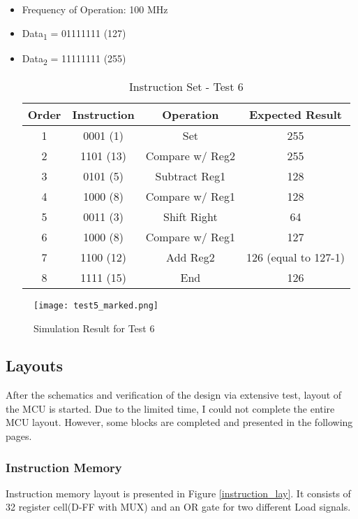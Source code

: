 \documentclass[12pt]{article}
\begin{document}
\begin{itemize}
\item Frequency of Operation: 100 MHz
\item Data\textsubscript{1} = 01111111 (127) 
\item Data\textsubscript{2} = 11111111 (255) 
\begin{table}[h]
\centering
\begin{tabular}{|c|c|c|c|}
\hline 
Order & Instruction & Operation & Expected Result \\ 
\hline 
1 & 0001 (1) & Set & 255 \\ 
\hline 
2 & 1101 (13) & Compare w/ Reg2 & 255 \\ 
\hline 
3 & 0101 (5) & Subtract Reg1 & 128 \\ 
\hline 
4 & 1000 (8) & Compare w/ Reg1 & 128 \\ 
\hline 
5 & 0011 (3) & Shift Right & 64 \\ 
\hline 
6 & 1000 (8) & Compare w/ Reg1 & 127 \\ 
\hline 
7 & 1100 (12) & Add Reg2 & 126 (equal to 127-1) \\ 
\hline 
8 & 1111 (15) & End & 126 \\ 
\hline 
\end{tabular} 
\caption{Instruction Set - Test 6}
\end{table}
\end{itemize}


\begin{figure}[H]
\centering
\texttt{[image: test5\_marked.png]}
\caption{Simulation Result for Test 6}
\label{test6}
\end{figure}









\newpage
\subsection*{Layouts}
\label{lay}
After the schematics and verification of the design via extensive test, layout of the MCU is started. Due to the limited time, I could not complete the entire MCU layout. However, some blocks are completed and presented in the following pages.

\subsubsection*{Instruction Memory}
Instruction memory layout is presented in Figure \ref{instruction_lay}. It consists of 32 register cell(D-FF with MUX) and an OR gate for two different Load signals. \\
\end{document}
